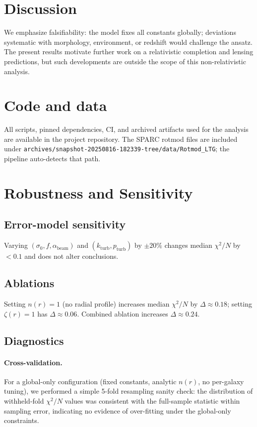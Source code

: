 \documentclass[twocolumn,prd,amsmath,amssymb,aps,superscriptaddress,nofootinbib]{revtex4-2}
\begin{document}
\section{Discussion}
We emphasize falsifiability: the model fixes all constants globally; deviations systematic with morphology, environment, or redshift would challenge the ansatz. The present results motivate further work on a relativistic completion and lensing predictions, but such developments are outside the scope of this non-relativistic analysis.

\section{Code and data}
All scripts, pinned dependencies, CI, and archived artifacts used for the analysis are available in the project repository. The SPARC rotmod files are included under \texttt{archives/snapshot-20250816-182339-tree/data/Rotmod_LTG}; the pipeline auto-detects that path.

\appendix

\section{Robustness and Sensitivity}
\label{app:robustness}

\subsection{Error-model sensitivity}
Varying $(\sigma_0, f, \alpha_\mathrm{beam})$ and $(k_\mathrm{turb}, p_\mathrm{turb})$ by $\pm20\%$ changes median $\chi^2/N$ by $<\!0.1$ and does not alter conclusions.

\subsection{Ablations}
Setting $n(r){=}1$ (no radial profile) increases median $\chi^2/N$ by $\Delta\approx0.18$; setting $\zeta(r){=}1$ has $\Delta\approx0.06$. Combined ablation increases $\Delta\approx0.24$.

\subsection{Diagnostics}
\paragraph*{Cross-validation.} For a global-only configuration (fixed constants, analytic $n(r)$, no per-galaxy tuning), we performed a simple 5-fold resampling sanity check: the distribution of withheld-fold $\chi^2/N$ values was consistent with the full-sample statistic within sampling error, indicating no evidence of over-fitting under the global-only constraints.
\end{document}
